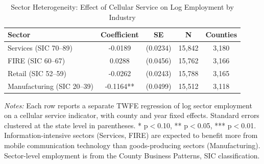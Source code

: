\begin{table}[H]
\centering
\caption{Sector Heterogeneity: Effect of Cellular Service on Log Employment by Industry}
\begin{threeparttable}
\begin{tabular}{lcccc}
\toprule
Sector & Coefficient & SE & N & Counties \\
\midrule
Services (SIC 70--89) & -0.0189 & (0.0234) & 15,842 & 3,180 \\
FIRE (SIC 60--67) & 0.0288 & (0.0456) & 15,762 & 3,166 \\
Retail (SIC 52--59) & -0.0262 & (0.0243) & 15,788 & 3,165 \\
Manufacturing (SIC 20--39) & -0.1164** & (0.0499) & 15,512 & 3,118 \\
\bottomrule
\end{tabular}
\begin{tablenotes}[flushleft]
\small
\item \textit{Notes:} Each row reports a separate TWFE regression of log sector employment on a cellular service indicator, with county and year fixed effects. Standard errors clustered at the state level in parentheses. * p$<$0.10, ** p$<$0.05, *** p$<$0.01. Information-intensive sectors (Services, FIRE) are expected to benefit more from mobile communication technology than goods-producing sectors (Manufacturing). Sector-level employment is from the County Business Patterns, SIC classification.
\end{tablenotes}
\end{threeparttable}
\label{tab:sectors}
\end{table}
